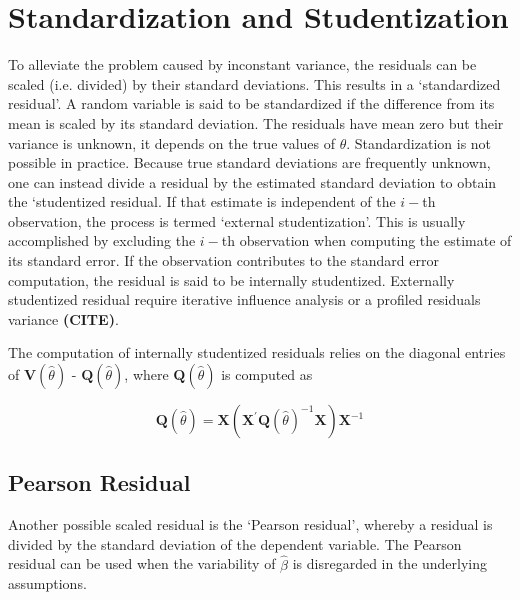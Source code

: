 \documentclass[12pt, a4paper]{report}
\theoremstyle{plain}
\theoremstyle{definition}
\theoremstyle{remark}
\begin{document}
\section{Standardization and Studentization} %
To alleviate the problem caused by inconstant variance, the residuals can be scaled (i.e. divided) by their standard deviations. This results in a `standardized residual'. A random variable is said to be standardized if the difference from its mean is scaled by its standard deviation. The residuals  have mean zero but their variance is unknown, it depends on the true values of $\theta$. Standardization is  not possible in practice. Because true standard deviations are frequently unknown, one can instead divide a residual by the estimated standard deviation to obtain the `studentized residual. 
If that estimate is independent of the $i-$th observation, the process is termed `external studentization'. This is usually accomplished by excluding the $i-$th observation when computing the estimate of its standard error. If the observation contributes to the
standard error computation, the residual is said to be internally studentized.
Externally  studentized residual require iterative influence analysis or a profiled residuals variance \textbf{(CITE)}.



The computation of internally studentized residuals relies on the diagonal entries of $\boldsymbol{V} (\hat{\theta})$ - $\boldsymbol{Q} (\hat{\theta})$, where $\boldsymbol{Q} (\hat{\theta})$ is computed as

\[ \boldsymbol{Q} (\hat{\theta}) = \boldsymbol{X} ( \boldsymbol{X}^{\prime}\boldsymbol{Q} (\hat{\theta})^{-1}\boldsymbol{X})\boldsymbol{X}^{-1} \]


\subsection{Pearson Residual}%

Another possible scaled residual is the  `Pearson residual', whereby a residual is divided by the standard deviation of the dependent variable. The Pearson residual can be used when the variability of $\hat{\beta}$ is disregarded in the underlying assumptions.
\end{document}

